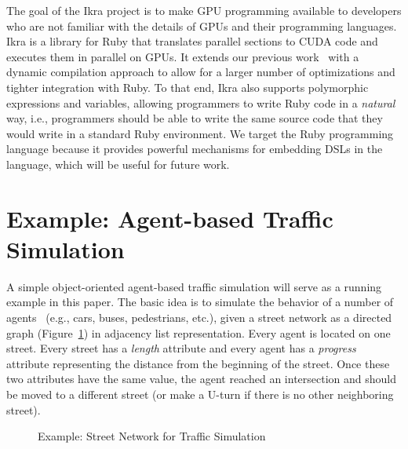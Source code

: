 \documentclass[preprint]{sigplanconf}
\begin{document}
The goal of the Ikra project is to make GPU programming available to developers who are not familiar with the details of GPUs and their programming languages. Ikra is a library for Ruby that translates parallel sections to CUDA code and executes them in parallel on GPUs. It extends our previous work~\cite{Masuhara:2012:DER:2237887.2237888} with a dynamic compilation approach to allow for a larger number of optimizations and tighter integration with Ruby. To that end, Ikra also supports polymorphic expressions and variables, allowing programmers to write Ruby code in a \emph{natural} way, i.e., programmers should be able to write the same source code that they would write in a standard Ruby environment. We target the Ruby programming language because it provides powerful mechanisms for embedding DSLs in the language, which will be useful for future work.

\section{Example: Agent-based Traffic Simulation}
A simple object-oriented agent-based traffic simulation will serve as a running example in this paper. The basic idea is to simulate the behavior of a number of agents~\cite{Helbing2012} (e.g., cars, buses, pedestrians, etc.), given a street network as a directed graph (Figure~\ref{fig:running_example}) in adjacency list representation. Every agent is located on one street. Every street has a \emph{length} attribute and every agent has a \emph{progress} attribute representing the distance from the beginning of the street. Once these two attributes have the same value, the agent reached an intersection and should be moved to a different street (or make a U-turn if there is no other neighboring street).

\begin{figure}[!htp]
    \centering
    
    \caption{Example: Street Network for Traffic Simulation}
    \label{fig:running_example}%
\end{figure}
\end{document}

